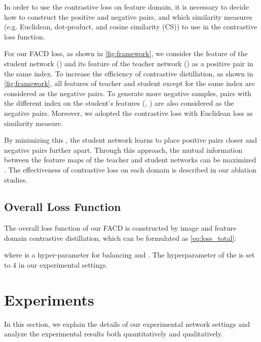 \documentclass[10pt,twocolumn,letterpaper]{article}
\begin{document}
In order to use the contrastive loss on feature domain, it is necessary to decide how to construct the positive and negative pairs, and which similarity measures (e.g. Euclidean, dot-product, and cosine similarity (CS)) to use in the contrastive loss function. 

For our FACD loss, as shown in \cref{fig:framework}, we consider the feature of the student network () and its feature of the teacher network () as a positive pair in the same index. To increase the efficiency of contrastive distillation, as shown in \cref{fig:framework}, all features of teacher and student except for the same index are considered as the negative pairs. To generate more negative samples, pairs with the different index on the student's features (, ) are also considered as the negative pairs. Moreover, we adopted the contrastive loss with Euclidean loss as similarity measure. 

By minimizing this , the student network learns to place positive pairs closer and negative pairs further apart. Through this approach, the mutual information between the feature maps of the teacher and student networks can be maximized \cite{crd}. The effectiveness of contrastive loss on each domain is described in our ablation studies. 



\subsection{Overall Loss Function}
\label{overall}
The overall loss function of our FACD is constructed by image and feature domain contrastive distillation, which can be formulated as \cref{eq:loss_total}:

where  is a hyper-parameter for balancing  and   . The hyperparameter of the  is set to 4 in our experimental settings.


\section{Experiments}
In this section, we explain the details of our experimental network settings and analyze the experimental results both quantitatively and qualitatively.
\end{document}
